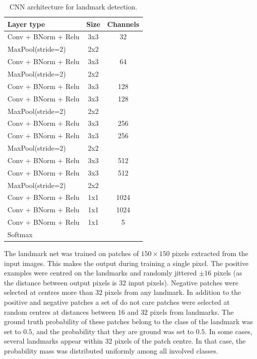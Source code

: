 \documentclass{IET}
\begin{document}
\begin{table}
\begin{center}
\begin{tabular}{|l|c|c|}
\hline
\textbf{Layer type} & \textbf{Size} & \textbf{Channels} \\
\hline

Conv + BNorm + Relu & 3x3 & 32 \\
MaxPool(stride=2) & 2x2 &  \\
\hline

Conv + BNorm + Relu & 3x3 & 64 \\
MaxPool(stride=2) & 2x2 &  \\
\hline

Conv + BNorm + Relu & 3x3 & 128 \\
Conv + BNorm + Relu & 3x3 & 128 \\
MaxPool(stride=2) & 2x2 &  \\
\hline

Conv + BNorm + Relu & 3x3 & 256 \\
Conv + BNorm + Relu & 3x3 & 256 \\
MaxPool(stride=2) & 2x2 &  \\
\hline

Conv + BNorm + Relu & 3x3 & 512 \\
Conv + BNorm + Relu & 3x3 & 512 \\
MaxPool(stride=2) & 2x2 &  \\
\hline

Conv + BNorm + Relu & 1x1 & 1024 \\
Conv + BNorm + Relu & 1x1 & 1024 \\
Conv + BNorm + Relu & 1x1 & 5 \\
Softmax & & \\
\hline

\end{tabular}
\end{center}
\caption{CNN architecture for landmark detection. 
}
\label{tab:cownet}
\end{table}

The landmark net was trained on patches of $150\times 150$ pixels extracted from the input images. This makes the output during training a single pixel. The positive examples were centred on the landmarks and randomly jittered $\pm 16$ pixels (as the distance between output pixels is $32$ input pixels). Negative patches were selected at centres more than $32$ pixels from any landmark. In addition to the positive and negative patches a set of do not care patches were selected at random centres at distances between $16$ and $32$ pixels from landmarks. The ground truth probability of these patches belong to the class of the landmark was set to $0.5$, and the probability that they are ground was set to $0.5$. In some cases, several landmarks appear within $32$ pixels of the patch centre. In that case, the probability mass was distributed uniformly among all involved classes.
\end{document}
